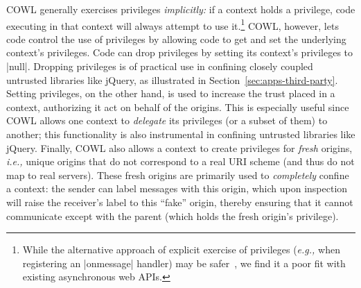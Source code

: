 COWL generally exercises privileges \emph{implicitly:} if a context
holds a privilege, code executing in that context will always attempt
to use it.\footnote{
While the alternative approach of explicit exercise of privileges
(\emph{e.g.,} when registering an \js|onmessage| handler) may be
safer~\cite{Zeldovich:2006, stefan:2011:flexible}, we find it a poor fit with
existing asynchronous web APIs.}
%
COWL, however,  lets code control the use of privileges by allowing code
to get and set the underlying context's privileges.
%
Code can drop privileges by setting its context's privileges to
\js|null|.
%
Dropping privileges is of practical use in confining closely
coupled untrusted libraries like jQuery, as illustrated in
Section~\ref{sec:apps-third-party}.
%
Setting privileges, on the other hand, is used to increase the
trust placed in a context, authorizing it act on behalf of the
origins.
%
This is especially useful since
COWL allows one context to {\em delegate} its privileges (or a subset
of them) to another; this functionality is also instrumental in
confining untrusted libraries like jQuery.
%
Finally, COWL also allows a context to create privileges for \emph{fresh}
origins, \emph{i.e.,} unique origins that do not correspond to a real URI
scheme (and thus do not map to real servers).
%
These fresh origins are primarily used to \emph{completely} confine a
context: the sender can label messages with this origin, which upon
inspection will raise the receiver's label to this ``fake'' origin,
thereby ensuring that it cannot communicate except with the parent
(which holds the fresh origin's privilege).
%
%





